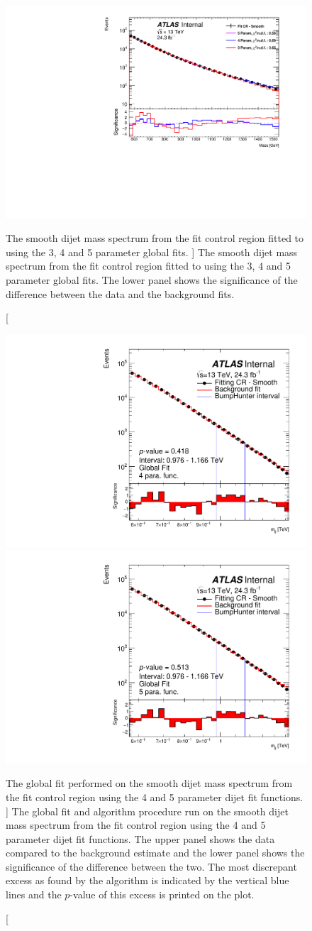 \begin{figure}[!htb]
\centering
\includegraphics[width=0.6\linewidth, angle=0]{figs/Dibjet/LowMass/FitStudy_min566/globalFit_lm_dh.pdf}
\caption
    [ The smooth dijet mass spectrum from the \lm{} fit control region
      fitted to using the 3, 4 and 5 parameter global fits.
    ]
    {\label{fig:lowmass_globalFit}
      The smooth dijet mass spectrum from the \lm{} fit control region
      fitted to using the 3, 4 and 5 parameter global fits.
      The lower panel shows the significance of the difference between the data and the background fits.}
\end{figure}
\begin{figure}[!htb]

\captionsetup[subfigure]{aboveskip=0pt,justification=centering}
\centering
{} {
  \includegraphics[width=0.45\linewidth, angle=0]{figs/Dibjet/LowMass/FitStudy_min566/globalFit_lm_bH_4para.pdf}
}
 {
  \includegraphics[width=0.45\linewidth, angle=0]{figs/Dibjet/LowMass/FitStudy_min566/globalFit_lm_bH_5para.pdf}
}
\caption
    [The global fit performed on the smooth dijet mass spectrum from the \lm{} fit control region
      using the 4 and 5 parameter dijet fit functions.
    ]
    {\label{fig:bhFit_lm_global}
      The global fit and \bh{} algorithm procedure run on the smooth dijet mass spectrum from the \lm{} fit control region
      using the 4 and 5 parameter dijet fit functions.
      The upper panel shows the data compared to the background estimate and the lower panel shows the significance of the difference between the two.
      The most discrepant excess as found by the \bh{} algorithm is indicated by the vertical blue lines and the \mbox{$p$-value} of this excess is printed on the plot. }
\end{figure}


